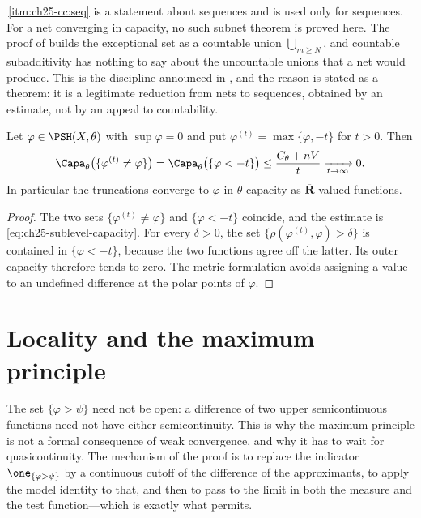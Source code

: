 \begin{remark}
\label{rem:ch25-nets-in-capacity}
\,\cref{itm:ch25-cc:seq} is a
statement about sequences and is used only for sequences.  For a net
converging in capacity, no such subnet theorem is proved here.  The proof of
 builds the exceptional set as a countable
union $\bigcup_{m\geq N}$, and countable subadditivity has nothing to say
about the uncountable unions that a net would produce.  This is the
discipline announced in , and the reason
 is stated as a theorem: it is a
legitimate reduction from nets to sequences, obtained by an estimate, not by
an appeal to countability.
\end{remark}

\begin{proposition}
\label{prop:ch25-truncation-capacity}
Let $\varphi\in\PSH(X,\theta)$ with $\sup\varphi=0$ and put
$\varphi^{(t)}=\max\{\varphi,-t\}$ for $t>0$.  Then
\[
 \Capa_\theta\bigl(\{\varphi^{(t)}\neq\varphi\}\bigr)
 =\Capa_\theta\bigl(\{\varphi<-t\}\bigr)
 \leq\frac{C_\theta+nV}{t}\xrightarrow[t\to\infty]{}0 .
\]
In particular the truncations converge to $\varphi$ in $\theta$-capacity as
$\overline{\mathbf R}$-valued functions.
\end{proposition}

\begin{proof}
The two sets $\{\varphi^{(t)}\neq\varphi\}$ and $\{\varphi<-t\}$
coincide, and the estimate is
\eqref{eq:ch25-sublevel-capacity}.  For every $\delta>0$, the set
$\{\rho(\varphi^{(t)},\varphi)>\delta\}$ is contained in
$\{\varphi<-t\}$, because the two functions agree off the latter.  Its outer
capacity therefore tends to zero.  The metric formulation avoids assigning
a value to an undefined difference at the polar points of $\varphi$.
\end{proof}

\section{Locality and the maximum principle}
\label{sec:ch25-maximum}

The set $\{\varphi>\psi\}$ need not be open: a difference of two upper
semicontinuous functions need not have either semicontinuity.  This is why the maximum principle is not a
formal consequence of weak convergence, and why it has to wait for
quasicontinuity.  The mechanism of the proof is to replace the indicator
$\one_{\{\varphi>\psi\}}$ by a continuous cutoff of the difference of the
approximants, to apply the model identity to that, and then to pass to the
limit in both the measure and the test function---which is exactly what
 permits.

